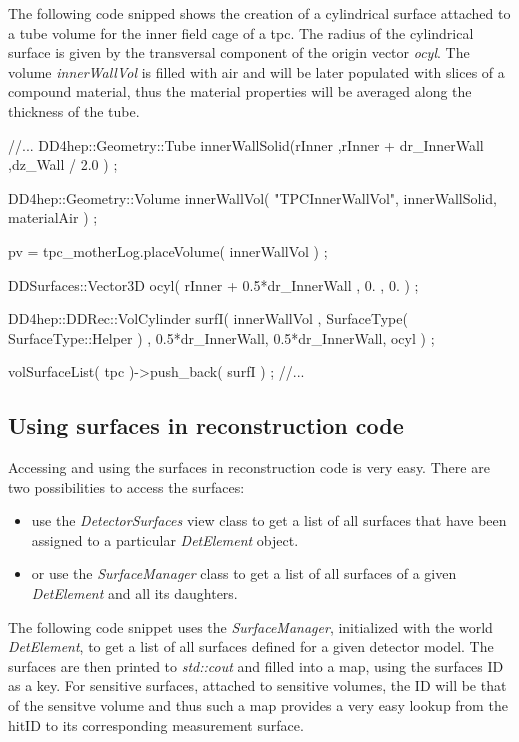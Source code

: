 \documentclass[10pt,a4paper]{article}
\begin{document}
\noindent
The following code snipped shows the creation of a cylindrical surface attached
to a tube volume for the inner field cage of a tpc. The radius of the cylindrical
surface is given by the transversal component of the origin vector {\em ocyl}.
The volume {\em innerWallVol} is filled with air and will be later populated
with slices of a compound material, thus the material properties will be
averaged along the thickness of the tube.

\begin{code}
  //...
  DD4hep::Geometry::Tube innerWallSolid(rInner ,rInner + dr_InnerWall ,dz_Wall / 2.0 ) ;

  DD4hep::Geometry::Volume innerWallVol( "TPCInnerWallVol", innerWallSolid, materialAir ) ; 

  pv = tpc_motherLog.placeVolume( innerWallVol ) ;

  DDSurfaces::Vector3D ocyl(  rInner + 0.5*dr_InnerWall , 0. , 0. ) ;

  DD4hep::DDRec::VolCylinder surfI( innerWallVol , 
                                    SurfaceType( SurfaceType::Helper ) ,
                                    0.5*dr_InnerWall, 0.5*dr_InnerWall, 
                                    ocyl ) ;

  volSurfaceList( tpc )->push_back(  surfI ) ;
  //...
\end{code}




\subsection{Using surfaces in reconstruction code}
\label{subsec:ddrec-surfaces-reconstruction}
Accessing and using the surfaces in reconstruction code is very easy. 
There are two possibilities to access the surfaces:
\begin{itemize}
\item use the {\em DetectorSurfaces} view class to get a list of 
 all surfaces that have been assigned to a particular {\em DetElement}
 object.
\item or use the {\em SurfaceManager} class to get a list of all
 surfaces of a given {\em DetElement} and all its daughters.
\end{itemize}

\noindent
The following code snippet uses the {\em SurfaceManager}, initialized
with the world  {\em DetElement}, to get a list of all surfaces 
defined for a given detector model.
The surfaces are then printed to {\em std::cout} and filled 
into a map, using the surfaces ID as a key.
For sensitive surfaces, attached to sensitive volumes, the ID
will be that of the sensitve volume and thus such a map provides
a very easy lookup from the hitID to its corresponding measurement
surface.
\end{document}
